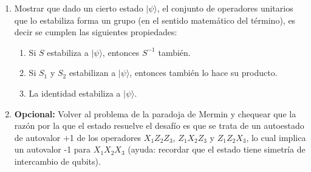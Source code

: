 \documentclass[a4paper,11pt,spanish]{article}
\newcommand{\ket}[1]{|#1\rangle}
\begin{document}
\begin{enumerate}
\begin{enumerate}
 \item Escribir el estado neblinoso $\ket{\psi}$ de la figura en notaci\'on de Dirac y en forma normalizada.
 \item Indicar dos operadores de Pauli generalizados que estabilizan a ese estado.
 \item Considerar las compuertas de los \'items a) y b), y mostrar c\'omo transforman a los estabilizadores, esto es: mostrar que las compuertas de a) que llevan del estado $\ket{00}$ a $\ket{\psi}$ transforman los estabilizadores de $\ket{00}$ en estabilizadores de $\ket{\psi}$, y mostrar luego c\'omo se modifican los estabilizadores de $\ket{\psi}$ al aplicar el circuito del \'item b).
\end{enumerate}
 \medskip

 \item Mostrar que dado un cierto estado $\ket{\psi}$, el conjunto de operadores unitarios que lo estabiliza forma un grupo (en el sentido matem\'atico del t\'ermino), es decir se cumplen las siguientes propiedades:
 \begin{enumerate}
  \item Si $S$ estabiliza a $\ket{\psi}$, entonces $S^{-1}$ tambi\'en.
  \item Si $S_1$ y $S_2$ estabilizan a $\ket{\psi}$, entonces tambi\'en lo hace su producto.\
  \item La identidad estabiliza a $\ket{\psi}$.
 \end{enumerate}
 \medskip

 \item {\bf Opcional:} Volver al problema de la paradoja de Mermin y chequear que la raz\'on por la que el estado resuelve el desaf\'io es que se trata de un autoestado de autovalor +1 de los operadores $X_1 Z_2 Z_3$, $Z_1X_2Z_3$ y $Z_1Z_2X_3$, lo cual implica un autovalor -1 para $X_1X_2X_3$ (ayuda: recordar que el estado tiene simetr\'ia de intercambio de qubits).

\end{enumerate}
\end{document}
